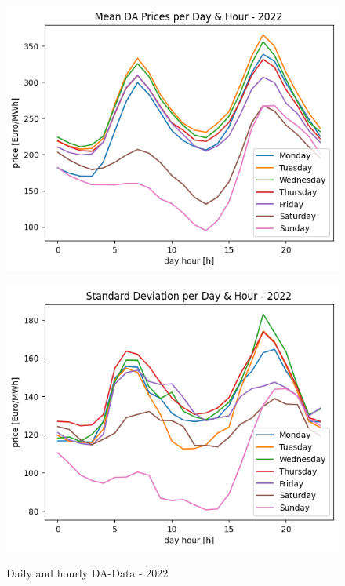 \begin{figure}[H]
	\centering
	\begin{minipage}{0.49\textwidth}
		\includegraphics[width=1\linewidth]{pictures/DA/Mean DA Prices per Day and Hour - 2022.png}
		\label{fig:meanDA2022}
	\end{minipage} \hfill
	\begin{minipage}{0.49\textwidth}
		\includegraphics[width=1\linewidth]{pictures/DA/Standard Deviation per Day and Hour - 2022.png}
		\label{fig:stdDA2022}
	\end{minipage}
	\caption{Daily and hourly DA-Data - 2022 }
\end{figure}


